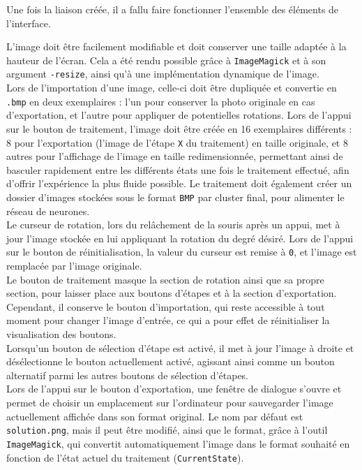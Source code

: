 \documentclass{article}
\begin{document}
Une fois la liaison créée, il a fallu faire fonctionner l'ensemble des éléments de l'interface.

L'image doit être facilement modifiable et doit conserver une taille adaptée à la hauteur de l'écran. Cela a été rendu possible grâce à \texttt{ImageMagick} et à son argument \texttt{-resize}, ainsi qu'à une implémentation dynamique de l'image.\\

Lors de l'importation d'une image, celle-ci doit être dupliquée et convertie en \texttt{.bmp} en deux exemplaires : l'un pour conserver la photo originale en cas d'exportation, et l'autre pour appliquer de potentielles rotations. Lors de l'appui sur le bouton de traitement, l'image doit être créée en 16 exemplaires différents : 8 pour l'exportation (l'image de l'étape \texttt{X} du traitement) en taille originale, et 8 autres pour l'affichage de l'image en taille redimensionnée, permettant ainsi de basculer rapidement entre les différents états une fois le traitement effectué, afin d'offrir l'expérience la plus fluide possible. Le traitement doit également créer un dossier d'images stockées sous le format \texttt{BMP} par cluster final, pour alimenter le réseau de neurones.\\

Le curseur de rotation, lors du relâchement de la souris après un appui, met à jour l'image stockée en lui appliquant la rotation du degré désiré. Lors de l'appui sur le bouton de réinitialisation, la valeur du curseur est remise à \texttt{0}, et l'image est remplacée par l'image originale.\\

Le bouton de traitement masque la section de rotation ainsi que sa propre section, pour laisser place aux boutons d'étapes et à la section d'exportation. Cependant, il conserve le bouton d'importation, qui reste accessible à tout moment pour changer l'image d'entrée, ce qui a pour effet de réinitialiser la visualisation des boutons.\\

Lorsqu'un bouton de sélection d'étape est activé, il met à jour l'image à droite et désélectionne le bouton actuellement activé, agissant ainsi comme un bouton alternatif parmi les autres boutons de sélection d'étapes.\\

Lors de l'appui sur le bouton d'exportation, une fenêtre de dialogue s'ouvre et permet de choisir un emplacement sur l'ordinateur pour sauvegarder l'image actuellement affichée dans son format original. Le nom par défaut est \texttt{solution.png}, mais il peut être modifié, ainsi que le format, grâce à l'outil \texttt{ImageMagick}, qui convertit automatiquement l'image dans le format souhaité en fonction de l'état actuel du traitement (\texttt{CurrentState}).\\
\end{document}
